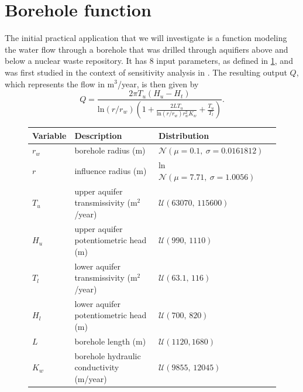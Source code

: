 \documentclass[
  a4paper,  %
  twoside,  %
  bibliography=totoc,
  headsepline,
  cleardoublepage=empty,
  parskip=half,
  draft=false
]{scrbook}
\begin{document}
\section{Borehole function}

The initial practical application that we will investigate is a function modeling the water flow through a borehole that was drilled through aquifiers above and below a nuclear waste repository.
It has 8 input parameters, as defined in \cref{tab:borehole_params}, and was first studied in the context of sensitivity analysis in \cite{Harper1983}.
The resulting output $Q$, which represents the flow in m$^3$/year, is then given by
\begin{equation}
Q=\frac{2 \pi T_u(H_u - H_t)}{\text{ln}(r / r_w) \left( 1 + \frac{2L T_u}{\text{ln}(r / r_w) r_w^2 K_w} + \frac{T_u}{T_l} \right)}.
\end{equation}


\begin{mdframed}[style=style]
\begin{figure}[H]
\centering
\bgroup
\def\arraystretch{1.2}%
  \begin{tabular}{ l l l l}
Variable & Description & Distribution\\
\hline
$r_w$ & borehole radius (m) & $\mathcal{N}(\mu=0.1, ~\sigma=0.0161812)$\\
$r$ & influence radius (m) & ln $\mathcal{N}(\mu=7.71, ~\sigma=1.0056)$\\
$T_u$ & upper aquifer transmissivity (m$^2$/year) & $\mathcal{U}(63070,\, 115600)$\\
$H_u$ & upper aquifer potentiometric head (m) & $\mathcal{U}(990,\,  1110)$\\
$T_l$ & lower aquifer transmissivity (m$^2$/year) & $\mathcal{U}(63.1,\, 116)$\\
$H_l$ & lower aquifer potentiometric head (m) & $\mathcal{U}(700, \, 820)$\\
$L$ & borehole length (m) & $\mathcal{U}(1120, 1680)$\\
$K_w$ & borehole hydraulic conductivity (m/year) & $\mathcal{U}(9855, \, 12045)$\\
\end{tabular}
\egroup\\
\vspace{0.5em}
\delimit
{}
\label{tab:borehole_params}
\end{figure}
\end{mdframed}
\end{document}
